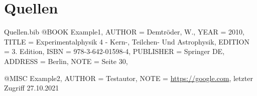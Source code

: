 \chapter{Quellen}
\renewcommand{\refname}{}   %
\renewcommand{\bibname}{}


\begin{filecontents}{Quellen.bib}
@BOOK
{
    Example1,
	AUTHOR = {Demtröder, W.},
	YEAR = {2010},
	TITLE = {Experimentalphysik 4 - Kern-, Teilchen- Und Astrophysik},
	EDITION = {3. Edition},
	ISBN = {978-3-642-01598-4},
	PUBLISHER = {Springer DE},
	ADDRESS = {Berlin},
    NOTE = {Seite 30},
}

@MISC
{
    Example2,
	AUTHOR = {Testautor},
    NOTE = {\url{https://google.com}, letzter Zugriff 27.10.2021}
}
\end{filecontents}